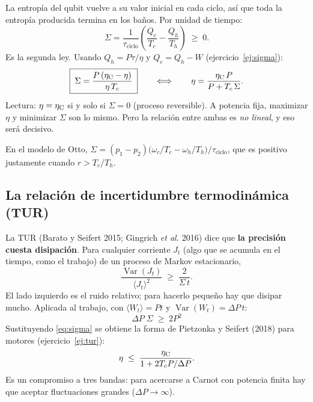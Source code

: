 La entropía del qubit vuelve a su valor inicial en cada ciclo, así que toda la entropía producida
termina en los baños. Por unidad de tiempo:
\begin{equation}
\Sigma = \frac{1}{\tau_{\mathrm{ciclo}}}\left(\frac{Q_c}{T_c} - \frac{Q_h}{T_h}\right) \;\ge\; 0 .
\end{equation}
Es la segunda ley. Usando $Q_h = P\tau/\eta$ y $Q_c = Q_h - W$ (ejercicio~\ref{ej:sigma}):
\begin{equation}
\boxed{\;\Sigma = \frac{P\,(\eta_{\mathrm{C}} - \eta)}{\eta\,T_c}\;}
\qquad\Longleftrightarrow\qquad
\eta = \frac{\eta_{\mathrm{C}}\,P}{P + T_c\,\Sigma}.
\label{eq:sigma}
\end{equation}
Lectura: $\eta = \eta_{\mathrm{C}}$ si y solo si $\Sigma = 0$ (proceso reversible). A potencia fija, maximizar
$\eta$ y minimizar $\Sigma$ son lo mismo. Pero la relación entre ambas es \emph{no lineal}, y eso
será decisivo.

En el modelo de Otto, $\Sigma = (p_1 - p_2)\bigl(\omega_c/T_c - \omega_h/T_h\bigr)/\tau_{\mathrm{ciclo}}$,
que es positivo justamente cuando $r > T_c/T_h$.

\subsection{La relación de incertidumbre termodinámica (TUR)}

La TUR (Barato y Seifert 2015; Gingrich \emph{et al.} 2016) dice que \textbf{la precisión cuesta
disipación}. Para cualquier corriente $J_t$ (algo que se acumula en el tiempo, como el trabajo) de un
proceso de Markov estacionario,
\begin{equation}
\frac{\operatorname{Var}(J_t)}{\langle J_t\rangle^2}\;\ge\;\frac{2}{\Sigma\,t}.
\end{equation}
El lado izquierdo es el ruido relativo; para hacerlo pequeño hay que disipar mucho. Aplicada al
trabajo, con $\langle W_t\rangle = Pt$ y $\operatorname{Var}(W_t) = \Delta P\,t$:
\begin{equation}
\boxed{\;\Delta P\;\Sigma\;\ge\;2P^2\;}
\label{eq:tur}
\end{equation}
Sustituyendo \eqref{eq:sigma} se obtiene la forma de Pietzonka y Seifert (2018) para motores
(ejercicio~\ref{ej:tur}):
\begin{equation}
\eta \;\le\; \frac{\eta_{\mathrm{C}}}{1 + 2T_cP/\Delta P}.
\end{equation}
Es un compromiso a tres bandas: para acercarse a Carnot con potencia finita hay que aceptar
fluctuaciones grandes ($\Delta P\to\infty$).

